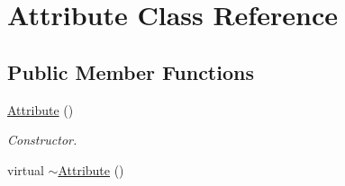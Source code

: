 \hypertarget{classAttribute}{\section{Attribute Class Reference}
\label{classAttribute}
}
\subsection*{Public Member Functions}
\begin{DoxyCompactItemize}
\item 
\hypertarget{classAttribute_a8ba4e5a507aef352563e1e56f1930e66}{\hyperlink{classAttribute_a8ba4e5a507aef352563e1e56f1930e66}{Attribute} ()}\label{classAttribute_a8ba4e5a507aef352563e1e56f1930e66}

\begin{DoxyCompactList}\small\item\em Constructor. \end{DoxyCompactList}\item 
\hypertarget{classAttribute_a28ab087bb886728670e4ae5791bc2ea8}{virtual \hyperlink{classAttribute_a28ab087bb886728670e4ae5791bc2ea8}{$\sim$\+Attribute} ()}\label{classAttribute_a28ab087bb886728670e4ae5791bc2ea8}


\end{DoxyCompactItemize}
